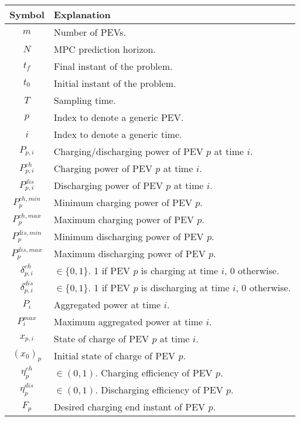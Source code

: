 \begin{table}[H]
    \centering
    \begin{tabular}{|c|p{}|}
        \hline
        Symbol & Explanation \\
        \hline
        \(m\) & Number of PEVs. \\
        \(N\) & MPC prediction horizon. \\
        \(t_f\) & Final instant of the problem. \\
        \(t_0\) & Initial instant of the problem. \\
        \(T\) & Sampling time. \\
        \(p\) & Index to denote a generic PEV. \\
        \(i\) & Index to denote a generic time. \\
        \(P_{p,i}\) & Charging/discharging power of PEV $p$ at time $i$. \\
        \(P^{ch}_{p,i}\) & Charging power of PEV $p$ at time $i$. \\
        \(P^{dis}_{p,i}\) & Discharging power of PEV $p$ at time $i$. \\
        \(P^{ch,min}_p\) & Minimum charging power of PEV $p$. \\
        \(P^{ch,max}_p\) & Maximum charging power of PEV $p$. \\
        \(P^{dis,min}_p\) & Minimum discharging power of PEV $p$. \\
        \(P^{dis,max}_p\) & Maximum discharging power of PEV $p$. \\
        \(\delta^{ch}_{p,i}\) & $\in \{0, 1\}.$ 1 if PEV $p$ is charging at time $i$, 0 otherwise. \\
        \(\delta^{dis}_{p,i}\) & $\in \{0, 1\}.$ 1 if PEV $p$ is discharging at time $i$, 0 otherwise. \\
        \(P_i\) & Aggregated power at time $i$. \\
        \(P^{max}_i\) & Maximum aggregated power at time $i$. \\
        \(x_{p,i}\) & State of charge of PEV $p$ at time $i$. \\
        \((x_0)_p\) & Initial state of charge of PEV $p$. \\
        \(\eta^{ch}_p\) & $\in (0, 1).$ Charging efficiency of PEV $p$. \\
        \(\eta^{dis}_p\) & $\in (0, 1).$ Discharging efficiency of PEV $p$. \\
        \(F_p\) & Desired charging end instant of PEV $p$. \\

\end{tabular}
\end{table}
